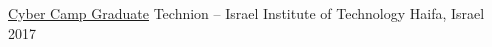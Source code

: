 

\begin{cvhonors}

  \cvhonor
    {\href{https://cont-edu.technion.ac.il/programs/cyber/cyber-camp-2/}{\underline{Cyber Camp Graduate}}} %
    {Technion – Israel Institute of Technology} %
    {Haifa, Israel} %
    {2017} %


\end{cvhonors}
